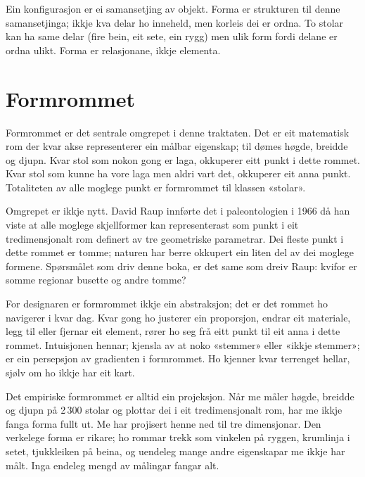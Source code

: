 Ein konfigurasjon er ei samansetjing av objekt. Forma er strukturen til denne samansetjinga; ikkje kva delar ho inneheld, men korleis dei er ordna. To stolar kan ha same delar (fire bein, eit sete, ein rygg) men ulik form fordi delane er ordna ulikt. Forma er relasjonane, ikkje elementa.

\section*{Formrommet}


Formrommet er det sentrale omgrepet i denne traktaten. Det er eit matematisk rom der kvar akse representerer ein målbar eigenskap; til dømes høgde, breidde og djupn. Kvar stol som nokon gong er laga, okkuperer eitt punkt i dette rommet. Kvar stol som kunne ha vore laga men aldri vart det, okkuperer eit anna punkt. Totaliteten av alle moglege punkt er formrommet til klassen «stolar».

Omgrepet er ikkje nytt. David Raup innførte det i paleontologien i 1966 då han viste at alle moglege skjellformer kan representerast som punkt i eit tredimensjonalt rom definert av tre geometriske parametrar. Dei fleste punkt i dette rommet er tomme; naturen har berre okkupert ein liten del av dei moglege formene. Spørsmålet som driv denne boka, er det same som dreiv Raup: kvifor er somme regionar busette og andre tomme?

For designaren er formrommet ikkje ein abstraksjon; det er det rommet ho navigerer i kvar dag. Kvar gong ho justerer ein proporsjon, endrar eit materiale, legg til eller fjernar eit element, rører ho seg frå eitt punkt til eit anna i dette rommet. Intuisjonen hennar; kjensla av at noko «stemmer» eller «ikkje stemmer»; er ein persepsjon av gradienten i formrommet. Ho kjenner kvar terrenget hellar, sjølv om ho ikkje har eit kart.

Det empiriske formrommet er alltid ein projeksjon. Når me måler høgde, breidde og djupn på 2\,300 stolar og plottar dei i eit tredimensjonalt rom, har me ikkje fanga forma fullt ut. Me har projisert henne ned til tre dimensjonar. Den verkelege forma er rikare; ho rommar trekk som vinkelen på ryggen, krumlinja i setet, tjukkleiken på beina, og uendeleg mange andre eigenskapar me ikkje har målt. Inga endeleg mengd av målingar fangar alt.

